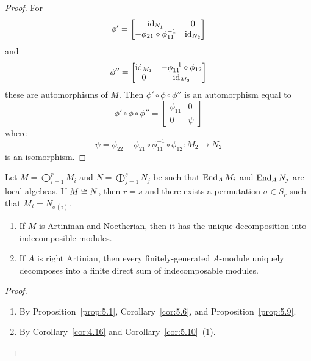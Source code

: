 \begin{proof}
For
\begin{equation}
\phi'=\begin{bmatrix}\operatorname{id}_{N_{1}} & 0\\
-\phi_{21}\circ\phi_{11}^{-1} & \operatorname{id}_{N_{2}}
\end{bmatrix}
\end{equation}
and
\begin{equation}
\phi''=\begin{bmatrix}\operatorname{id}_{M_{1}} & -\phi_{11}^{-1}\circ\phi_{12}\\
0 & \operatorname{id}_{M_{2}}
\end{bmatrix}
\end{equation}
these are automorphisms of $M$. Then $\phi'\circ\phi\circ\phi''$ is an
automorphism equal to
\begin{equation}
\phi'\circ\phi\circ\phi''=\begin{bmatrix}\phi_{11} & 0\\
0 & \psi\end{bmatrix}
\end{equation}
where
\begin{equation}
\psi=\phi_{22}-\phi_{21}\circ\phi_{11}^{-1}\circ\phi_{12}\colon
M_{2}\to N_{2}
\end{equation}
is an isomorphism.
\end{proof}

\begin{proposition}\label{prop:5.9}
Let $M=\bigoplus^{r}_{i=1}M_{i}$ and $N=\bigoplus^{s}_{j=1}N_{j}$ be
such that $\operatorname{End}_{A}M_{i}$ and $\operatorname{End}_{A}N_{j}$ are local algebras. If
$M\cong N$, then $r=s$ and there exists a permutation $\sigma\in S_{r}$
such that $M_{i}=N_{\sigma(i)}$.
\end{proposition}

\begin{corollary}\label{cor:5.10}
\begin{enumerate}
\item If $M$ is Artininan and Noetherian, then it has the unique
  decomposition into indecomposible modules.
\item If $A$ is right Artinian, then every finitely-generated
  $A$-module uniquely decomposes into a finite direct sum of
  indecomposable modules.
\end{enumerate}
\end{corollary}

\begin{proof}
\begin{enumerate}
\item By Proposition~\ref{prop:5.1}, Corollary~\ref{cor:5.6}, and Proposition~\ref{prop:5.9}.
\item By Corollary~\ref{cor:4.16} and Corollary~\ref{cor:5.10}~(1).\qedhere
\end{enumerate}
\end{proof}

